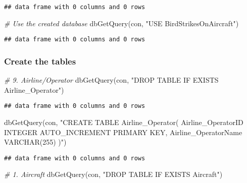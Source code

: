 \documentclass[
]{article}
\newenvironment{Shaded}{\begin{snugshade}}{\end{snugshade}}
\newcommand{\CommentTok}[1]{\textcolor[rgb]{0.56,0.35,0.01}{\textit{#1}}}
\newcommand{\FunctionTok}[1]{\textcolor[rgb]{0.00,0.00,0.00}{#1}}
\newcommand{\NormalTok}[1]{#1}
\newcommand{\StringTok}[1]{\textcolor[rgb]{0.31,0.60,0.02}{#1}}
\begin{document}
\begin{verbatim}
## data frame with 0 columns and 0 rows
\end{verbatim}

\begin{Shaded}
\begin{Highlighting}[]
\CommentTok{\# Use the created database}
\FunctionTok{dbGetQuery}\NormalTok{(con, }\StringTok{"USE BirdStrikesOnAircraft"}\NormalTok{)}
\end{Highlighting}
\end{Shaded}

\begin{verbatim}
## data frame with 0 columns and 0 rows
\end{verbatim}

\hypertarget{create-the-tables}{%
\subsubsection{Create the tables}\label{create-the-tables}}

\begin{Shaded}
\begin{Highlighting}[]
\CommentTok{\# 9. Airline/Operator}
\FunctionTok{dbGetQuery}\NormalTok{(con, }\StringTok{"DROP TABLE IF EXISTS Airline\_Operator"}\NormalTok{)}
\end{Highlighting}
\end{Shaded}

\begin{verbatim}
## data frame with 0 columns and 0 rows
\end{verbatim}

\begin{Shaded}
\begin{Highlighting}[]
\FunctionTok{dbGetQuery}\NormalTok{(con, }\StringTok{"CREATE TABLE Airline\_Operator(}
\StringTok{    Airline\_OperatorID INTEGER AUTO\_INCREMENT PRIMARY KEY,}
\StringTok{    Airline\_OperatorName VARCHAR(255)}
\StringTok{)"}\NormalTok{)}
\end{Highlighting}
\end{Shaded}

\begin{verbatim}
## data frame with 0 columns and 0 rows
\end{verbatim}

\begin{Shaded}
\begin{Highlighting}[]
\CommentTok{\# 1. Aircraft}
\FunctionTok{dbGetQuery}\NormalTok{(con, }\StringTok{"DROP TABLE IF EXISTS Aircraft"}\NormalTok{)}
\end{Highlighting}
\end{Shaded}
\end{document}
